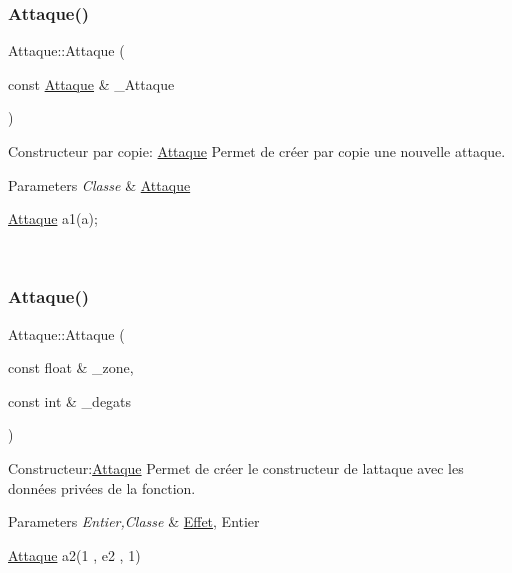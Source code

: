 \subsubsection{\texorpdfstring{Attaque()}{Attaque()}\hspace{0.1cm}{\footnotesize\ttfamily [2/3]}}
{\footnotesize\ttfamily Attaque\+::\+Attaque (\begin{DoxyParamCaption}\item[{const \hyperlink{classAttaque}{Attaque} \&}]{\+\_\+\+Attaque }\end{DoxyParamCaption})}



Constructeur par copie\+: \hyperlink{classAttaque}{Attaque} Permet de créer par copie une nouvelle attaque. 


\begin{DoxyParams}{Parameters}
{\em Classe} & \hyperlink{classAttaque}{Attaque} 
\begin{DoxyCode}
\hyperlink{classAttaque}{Attaque} a1(a);
\end{DoxyCode}
 \\
\hline
\end{DoxyParams}
\mbox{\label{classAttaque_a103553de7b33d7f8682f9beaa51d878a}} 
\subsubsection{\texorpdfstring{Attaque()}{Attaque()}\hspace{0.1cm}{\footnotesize\ttfamily [3/3]}}
{\footnotesize\ttfamily Attaque\+::\+Attaque (\begin{DoxyParamCaption}\item[{const float \&}]{\+\_\+zone,  }\item[{const int \&}]{\+\_\+degats }\end{DoxyParamCaption})}



Constructeur\+:\hyperlink{classAttaque}{Attaque} Permet de créer le constructeur de l\textquotesingle{}attaque avec les données privées de la fonction. 


\begin{DoxyParams}{Parameters}
{\em Entier,Classe} & \hyperlink{classEffet}{Effet}, Entier 
\begin{DoxyCode}
\hyperlink{classAttaque}{Attaque} a2(1 , e2 , 1)
\end{DoxyCode}
 \\
\hline
\end{DoxyParams}


